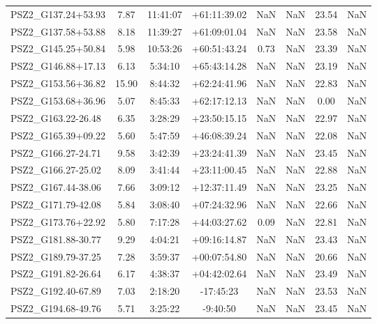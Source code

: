 \documentclass[apj, revtex4]{emulateapj}
\begin{document}
\begin{longtable*}{lccccccc}
    PSZ2\_G137.24+53.93 &  7.87 &  11:41:07 &  +61:11:39.02 &         NaN &    NaN &   23.54 &       NaN \\
    PSZ2\_G137.58+53.88 &  8.18 &  11:39:27 &  +61:09:01.04 &         NaN &    NaN &   23.58 &       NaN \\
    PSZ2\_G145.25+50.84 &  5.98 &  10:53:26 &  +60:51:43.24 &        0.73 &    NaN &   23.39 &       NaN \\
    PSZ2\_G146.88+17.13 &  6.13 &   5:34:10 &  +65:43:14.28 &         NaN &    NaN &   23.19 &       NaN \\
    PSZ2\_G153.56+36.82 & 15.90 &   8:44:32 &  +62:24:41.96 &         NaN &    NaN &   22.83 &       NaN \\
    PSZ2\_G153.68+36.96 &  5.07 &   8:45:33 &  +62:17:12.13 &         NaN &    NaN &    0.00 &       NaN \\
    PSZ2\_G163.22-26.48 &  6.35 &   3:28:29 &  +23:50:15.15 &         NaN &    NaN &   22.97 &       NaN \\
    PSZ2\_G165.39+09.22 &  5.60 &   5:47:59 &  +46:08:39.24 &         NaN &    NaN &   22.08 &       NaN \\
    PSZ2\_G166.27-24.71 &  9.58 &   3:42:39 &  +23:24:41.39 &         NaN &    NaN &   23.45 &       NaN \\
    PSZ2\_G166.27-25.02 &  8.09 &   3:41:44 &  +23:11:00.45 &         NaN &    NaN &   22.88 &       NaN \\
    PSZ2\_G167.44-38.06 &  7.66 &   3:09:12 &  +12:37:11.49 &         NaN &    NaN &   23.25 &       NaN \\
    PSZ2\_G171.79-42.08 &  5.84 &   3:08:40 &  +07:24:32.96 &         NaN &    NaN &   22.66 &       NaN \\
    PSZ2\_G173.76+22.92 &  5.80 &   7:17:28 &  +44:03:27.62 &        0.09 &    NaN &   22.81 &       NaN \\
    PSZ2\_G181.88-30.77 &  9.29 &   4:04:21 &  +09:16:14.87 &         NaN &    NaN &   23.43 &       NaN \\
    PSZ2\_G189.79-37.25 &  7.28 &   3:59:37 &  +00:07:54.80 &         NaN &    NaN &   20.66 &       NaN \\
    PSZ2\_G191.82-26.64 &  6.17 &   4:38:37 &  +04:42:02.64 &         NaN &    NaN &   23.49 &       NaN \\
    PSZ2\_G192.40-67.89 &  7.03 &   2:18:20 &     -17:45:23 &         NaN &    NaN &   23.53 &       NaN \\
    PSZ2\_G194.68-49.76 &  5.71 &   3:25:22 &      -9:40:50 &         NaN &    NaN &   23.45 &       NaN \\

\end{longtable*}
\end{document}
